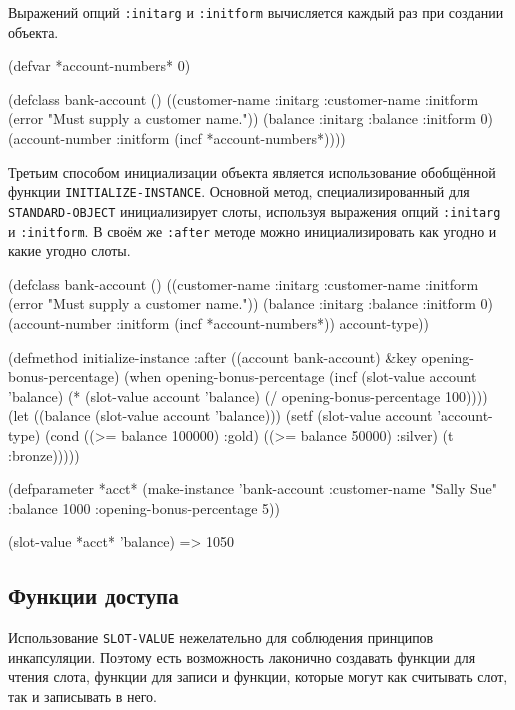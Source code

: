 Выражений опций \lstinline{:initarg} и \lstinline{:initform} вычисляется каждый раз при создании объекта.
\begin{cllst}{}{}
(defvar *account-numbers* 0)
 
(defclass bank-account ()
  ((customer-name
    :initarg :customer-name
    :initform (error "Must supply a customer name."))
   (balance
    :initarg :balance
    :initform 0)
   (account-number
    :initform (incf *account-numbers*))))
\end{cllst}

Третьим способом инициализации объекта является использование обобщённой функции \lstinline{INITIALIZE-INSTANCE}. Основной метод, специализированный для \lstinline{STANDARD-OBJECT} инициализирует слоты, используя выражения опций \lstinline{:initarg} и \lstinline{:initform}. В своём же \lstinline{:after} методе можно инициализировать как угодно и какие угодно слоты.
\begin{cllst}{}{}
(defclass bank-account ()
  ((customer-name
    :initarg :customer-name
    :initform (error "Must supply a customer name."))
   (balance
    :initarg :balance
    :initform 0)
   (account-number
    :initform (incf *account-numbers*))
   account-type))

(defmethod initialize-instance :after ((account bank-account)
                                       &key opening-bonus-percentage)
  (when opening-bonus-percentage
    (incf (slot-value account 'balance)
          (* (slot-value account 'balance) (/ opening-bonus-percentage 100))))
  (let ((balance (slot-value account 'balance)))
    (setf (slot-value account 'account-type)
          (cond
            ((>= balance 100000) :gold)
            ((>= balance 50000) :silver)
            (t :bronze)))))

(defparameter *acct* (make-instance
                       'bank-account
                        :customer-name "Sally Sue"
                        :balance 1000
                        :opening-bonus-percentage 5))

(slot-value *acct* 'balance) => 1050
\end{cllst}

\subsection{Функции доступа}
Использование \lstinline{SLOT-VALUE} нежелательно для соблюдения принципов инкапсуляции. Поэтому есть возможность лаконично создавать функции для чтения слота, функции для записи и функции, которые могут как считывать слот, так и записывать в него.

